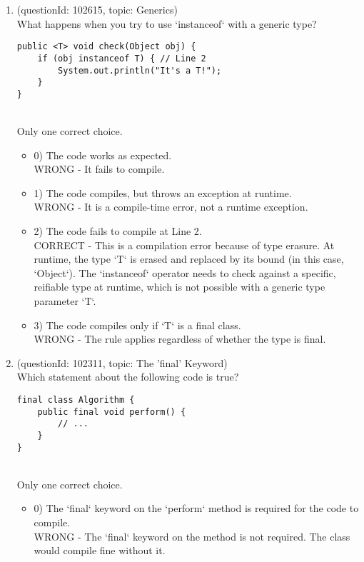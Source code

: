 \documentclass[12pt]{article}
\begin{document}
\begin{enumerate}[label=(\arabic*)]
\begin{itemize}
\end{itemize}
\item (questionId: 102615, topic: Generics) \\ 
What happens when you try to use `instanceof` with a generic type?\begin{verbatim}
public <T> void check(Object obj) {
    if (obj instanceof T) { // Line 2
        System.out.println("It's a T!");
    }
}
\end{verbatim}
\\ \noindent Only one correct choice. 
\begin{itemize}
\item 0) The code works as expected.
 \\ 
WRONG - It fails to compile.

\item 1) The code compiles, but throws an exception at runtime.
 \\ 
WRONG - It is a compile-time error, not a runtime exception.

\item 2) The code fails to compile at Line 2.
 \\ 
CORRECT - This is a compilation error because of type erasure. At runtime, the type `T` is erased and replaced by its bound (in this case, `Object`). The `instanceof` operator needs to check against a specific, reifiable type at runtime, which is not possible with a generic type parameter `T`.

\item 3) The code compiles only if `T` is a final class.
 \\ 
WRONG - The rule applies regardless of whether the type is final.

\end{itemize}
\item (questionId: 102311, topic: The 'final' Keyword) \\ 
Which statement about the following code is true?\n\begin{verbatim}
final class Algorithm {
    public final void perform() {
        // ...
    }
}
\end{verbatim}
\\ \noindent Only one correct choice. 
\begin{itemize}
\item 0) The `final` keyword on the `perform` method is required for the code to compile.
 \\ 
WRONG - The `final` keyword on the method is not required. The class would compile fine without it.


\end{itemize}
\end{enumerate}
\end{document}
